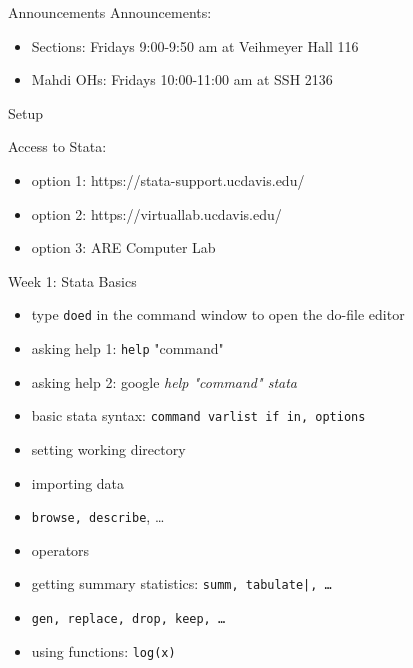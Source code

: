 \documentclass{beamer}
\begin{document}
\begin{frame}{Announcements}
Announcements:
\begin{itemize}
\item Sections: Fridays 9:00-9:50 am at Veihmeyer Hall 116
\item Mahdi OHs: Fridays 10:00-11:00 am at SSH 2136  
\end{itemize}
\end{frame}

\begin{frame}{Setup}

Access to Stata:
\begin{itemize}
\item option 1: https://stata-support.ucdavis.edu/
\item option 2: https://virtuallab.ucdavis.edu/
\item option 3: ARE Computer Lab
\end{itemize}
\end{frame}

\begin{frame}{Week 1: Stata Basics}

\begin{itemize}
\item type \texttt{doed} in the command window to open the do-file editor
\item asking help 1: \texttt{help} "command"
\item asking help 2: google \emph{help "command" stata}
\item basic stata syntax: \texttt{command varlist if in, options}
\end{itemize}

\begin{itemize}
\item setting working directory
\item importing data
\item \texttt{browse, describe}, \dots
\item operators
\item getting summary statistics: \texttt{summ, tabulate|, \dots}
\item \texttt{gen, replace, drop, keep, \dots}
\item using functions: \texttt{log(x)}
\end{itemize}

\end{frame}
\end{document}
